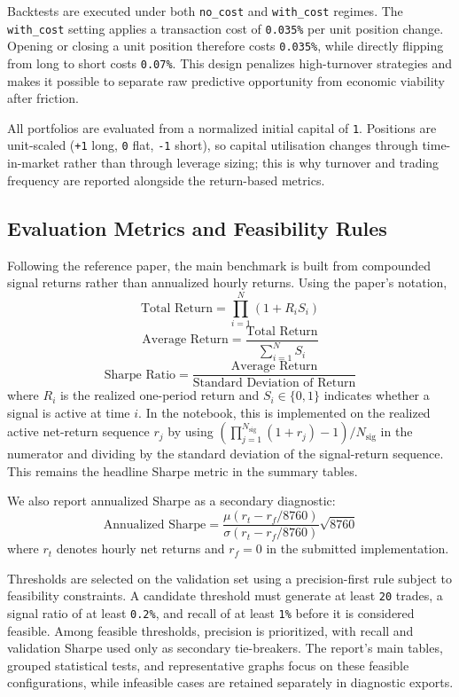 \documentclass[12pt]{article}
\begin{document}
Backtests are executed under both \texttt{no\_cost} and \texttt{with\_cost} regimes. The \texttt{with\_cost} setting applies a transaction cost of \texttt{0.035\%} per unit position change. Opening or closing a unit position therefore costs \texttt{0.035\%}, while directly flipping from long to short costs \texttt{0.07\%}. This design penalizes high-turnover strategies and makes it possible to separate raw predictive opportunity from economic viability after friction.

All portfolios are evaluated from a normalized initial capital of \texttt{1}. Positions are unit-scaled (\texttt{+1} long, \texttt{0} flat, \texttt{-1} short), so capital utilisation changes through time-in-market rather than through leverage sizing; this is why turnover and trading frequency are reported alongside the return-based metrics.

\subsection{Evaluation Metrics and Feasibility Rules}

Following the reference paper, the main benchmark is built from compounded signal returns rather than annualized hourly returns. Using the paper's notation,
\[
\text{Total Return} = \prod_{i=1}^{N}(1 + R_i S_i)
\]
\[
\text{Average Return} = \frac{\text{Total Return}}{\sum_{i=1}^{N} S_i}
\]
\[
\text{Sharpe Ratio} = \frac{\text{Average Return}}{\text{Standard Deviation of Return}}
\]
where \(R_i\) is the realized one-period return and \(S_i \in \{0,1\}\) indicates whether a signal is active at time \(i\). In the notebook, this is implemented on the realized active net-return sequence \(r_j\) by using \((\prod_{j=1}^{N_{\text{sig}}}(1+r_j)-1)/N_{\text{sig}}\) in the numerator and dividing by the standard deviation of the signal-return sequence. This remains the headline Sharpe metric in the summary tables.

We also report annualized Sharpe as a secondary diagnostic:
\[
\text{Annualized Sharpe} =
\frac{\mu(r_t - r_f / 8760)}{\sigma(r_t - r_f / 8760)} \sqrt{8760}
\]
where \(r_t\) denotes hourly net returns and \(r_f = 0\) in the submitted implementation.

Thresholds are selected on the validation set using a precision-first rule subject to feasibility constraints. A candidate threshold must generate at least \texttt{20} trades, a signal ratio of at least \texttt{0.2\%}, and recall of at least \texttt{1\%} before it is considered feasible. Among feasible thresholds, precision is prioritized, with recall and validation Sharpe used only as secondary tie-breakers. The report’s main tables, grouped statistical tests, and representative graphs focus on these feasible configurations, while infeasible cases are retained separately in diagnostic exports.
\end{document}
